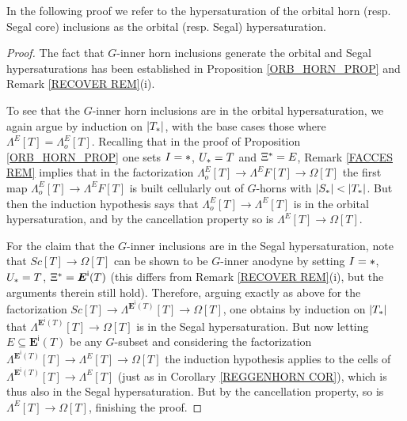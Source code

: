 \documentclass[a4paper,10pt
,draft
]{article}%
\begin{document}
In the following proof we refer to the hypersaturation
of the orbital horn (resp. Segal core) inclusions as the orbital (resp. Segal) hypersaturation.


\begin{proof}
	The fact that $G$-inner horn inclusions generate the orbital and Segal hypersaturations has been established in Proposition \ref{ORB_HORN_PROP} and Remark \ref{RECOVER REM}(i).
	
	To see that the $G$-inner horn inclusions are in the orbital hypersaturation, we again argue by induction on $|T_{\**}|$, with the base cases those where $\Lambda^{E} [T]=\Lambda^{E}_o [T]$.
	Recalling that in the proof of Proposition \ref{ORB_HORN_PROP}
	one sets
	$I=\**$, $U_{\**} = T$ and $\Xi^{\**} = E$,
	Remark \ref{FACCES REM} implies that in the factorization
	$\Lambda_o^E[T] \to \Lambda^EF[T] \to \Omega[T]$
	the first map $\Lambda_o^E[T] \to \Lambda^EF[T]$ is built cellularly out of $G$-horns with $|S_{\**}| < |T_{\**}|$.
	But then the induction hypothesis says that 
	$\Lambda_o^E[T] \to \Lambda^E[T]$ is in the orbital hypersaturation, and by the cancellation property so is $\Lambda^E[T] \to \Omega[T]$.
	
	For the claim that the $G$-inner inclusions are in the Segal hypersaturation,
	note that $Sc[T] \to \Omega[T]$ can be shown to be $G$-inner anodyne by setting $I=\**$, $U_{\**} = T$, $\Xi^{\**} = \boldsymbol{E}^{\mathsf{i}}(T)$
	(this differs from Remark \ref{RECOVER REM}(i), but the arguments therein still hold).
	Therefore, arguing exactly as above for the factorization
	$Sc[T] \to \Lambda^{\boldsymbol{E}^{\mathsf{i}}(T)}[T] \to \Omega[T]$,
	one obtains by induction on $|T_{\**}|$ that
	$\Lambda^{\boldsymbol{E}^{\mathsf{i}}(T)}[T] \to \Omega[T]$
	is in the Segal hypersaturation. 
	But now letting $E \subseteq \boldsymbol{E}^{\mathsf{i}}(T)$ be any $G$-subset and considering the factorization
	$\Lambda^{\boldsymbol{E}^{\mathsf{i}}(T)}[T] \to 
	\Lambda^{E}[T] \to
	\Omega[T]$ the induction hypothesis applies to the cells of
	$\Lambda^{\boldsymbol{E}^{\mathsf{i}}(T)}[T] \to \Lambda^{E}[T]$
	(just as in Corollary \ref{REGGENHORN COR}),
	which is thus also in the Segal hypersaturation.
	But by the cancellation property, so is 
	$\Lambda^{E}[T] \to \Omega[T]$, finishing the proof.
\end{proof}
\end{document}
